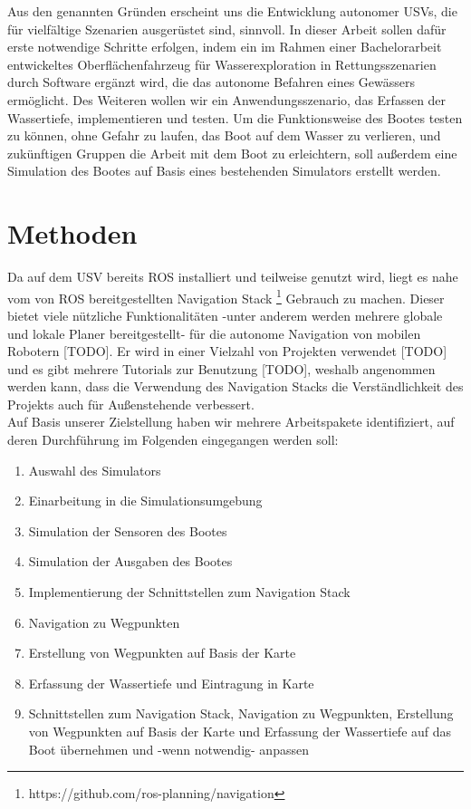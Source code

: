 \documentclass[conference]{IEEEtran}
\begin{document}
Aus den genannten Gründen erscheint uns die Entwicklung autonomer USVs, die für vielfältige Szenarien ausgerüstet sind, sinnvoll. In dieser Arbeit sollen dafür erste notwendige Schritte erfolgen, indem ein im Rahmen einer Bachelorarbeit entwickeltes Oberflächenfahrzeug für Wasserexploration in Rettungsszenarien durch Software ergänzt wird, die das autonome Befahren eines Gewässers ermöglicht. Des Weiteren wollen wir ein Anwendungsszenario, das Erfassen der Wassertiefe, implementieren und testen. Um die Funktionsweise des Bootes testen zu können, ohne Gefahr zu laufen, das Boot auf dem Wasser zu verlieren, und zukünftigen Gruppen die Arbeit mit dem Boot zu erleichtern, soll außerdem eine Simulation des Bootes auf Basis eines bestehenden Simulators erstellt werden.

\section{Methoden}
Da auf dem USV bereits ROS installiert und teilweise genutzt wird, liegt es nahe vom von ROS bereitgestellten Navigation Stack \footnote{https://github.com/ros-planning/navigation} Gebrauch zu machen. Dieser bietet viele nützliche Funktionalitäten -unter anderem werden mehrere globale und lokale Planer bereitgestellt- für die autonome Navigation von mobilen Robotern [TODO]. Er wird in einer Vielzahl von Projekten verwendet [TODO] und es gibt mehrere Tutorials zur Benutzung [TODO], weshalb angenommen werden kann, dass die Verwendung des Navigation Stacks die Verständlichkeit des Projekts auch für Außenstehende verbessert.\\
Auf Basis unserer Zielstellung haben wir mehrere Arbeitspakete identifiziert, auf deren Durchführung im Folgenden eingegangen werden soll:
\begin{enumerate}
	\item Auswahl des Simulators
	\item Einarbeitung in die Simulationsumgebung
	\item Simulation der Sensoren des Bootes
	\item Simulation der Ausgaben des Bootes
	\item Implementierung der Schnittstellen zum Navigation Stack
	\item Navigation zu Wegpunkten
	\item Erstellung von Wegpunkten auf Basis der Karte
	\item Erfassung der Wassertiefe und Eintragung in Karte
	\item Schnittstellen zum Navigation Stack, Navigation zu Wegpunkten, Erstellung von Wegpunkten auf Basis der Karte und Erfassung der Wassertiefe auf das Boot übernehmen und -wenn notwendig- anpassen
\end{enumerate}
\end{document}

